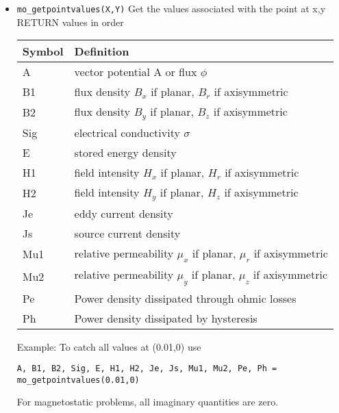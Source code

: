 \begin{itemize}
\item{\tt mo\_getpointvalues(X,Y)}
Get the values associated with the point at x,y RETURN values in
order
\begin{center}
\begin{tabular}{ll} \hline
Symbol & Definition \\ \hline
 A & vector potential A or flux $\phi$ \\
 B1 & flux density $B_x$ if planar, $B_r$ if axisymmetric \\
 B2 & flux density $B_y$ if planar, $B_z$ if axisymmetric \\
 Sig & electrical conductivity $\sigma$ \\
 E & stored energy density\\
 H1 & field intensity $H_x$ if planar, $H_r$ if axisymmetric \\
 H2 & field intensity $H_y$ if planar, $H_z$ if axisymmetric \\
 Je & eddy current density \\
 Js & source current density\\
 Mu1 & relative permeability $\mu_x$ if planar, $\mu_r$ if axisymmetric \\
 Mu2 & relative permeability $\mu_y$ if planar, $\mu_z$ if axisymmetric \\
 Pe & Power density dissipated through ohmic losses \\
 Ph & Power density dissipated by hysteresis \\ \hline
 \end{tabular}
\end{center}

Example: To catch all values at (0.01,0) use

{\tt A, B1, B2, Sig, E, H1, H2, Je, Js, Mu1, Mu2, Pe, Ph = mo\_getpointvalues(0.01,0)}

For magnetostatic problems, all imaginary quantities are zero.


\end{itemize}
